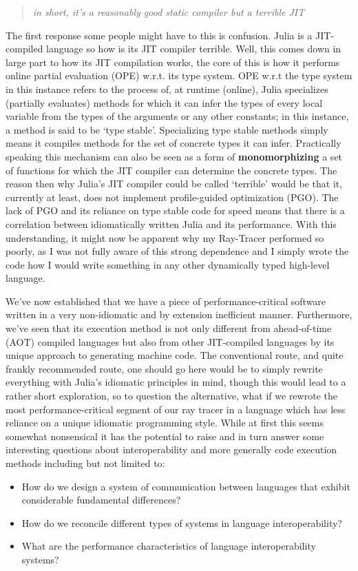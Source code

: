 \begin{quote}
    \textit{in short, it's a reasonably good static compiler but a terrible JIT}
\end{quote}

The first response some people might have to this is confusion. Julia is a JIT-compiled language so how is its JIT compiler terrible. Well, this comes down in large part to how its JIT compilation works, the core of this is how it performs online partial evaluation (OPE) w.r.t. its type system. OPE w.r.t the type system in this instance refers to the process of, at runtime (online), Julia specializes (partially evaluates) methods for which it can infer the types of every local variable from the types of the arguments or any other constants; in this instance, a method is said to be `type stable'. Specializing type stable methods simply means it compiles methods for the set of concrete types it can infer. Practically speaking this mechanism can also be seen as a form of \textbf{monomorphizing} a set of functions for which the JIT compiler can determine the concrete types. The reason then why Julia's JIT compiler could be called `terrible' would be that it, currently at least, does not implement profile-guided optimization (PGO). The lack of PGO and its reliance on type stable code for speed means that there is a correlation between idiomatically written Julia and its performance. With this understanding, it might now be apparent why my Ray-Tracer performed so poorly, as I was not fully aware of this strong dependence and I simply wrote the code how I would write something in any other dynamically typed high-level language.

We've now established that we have a piece of performance-critical software written in a very non-idiomatic and by extension inefficient manner. Furthermore, we've seen that its execution method is not only different from ahead-of-time (AOT) compiled languages but also from other JIT-compiled languages by its unique approach to generating machine code. The conventional route, and quite frankly recommended route, one should go here would be to simply rewrite everything with Julia's idiomatic principles in mind, though this would lead to a rather short exploration, so to question the alternative, what if we rewrote the most performance-critical segment of our ray tracer in a language which has less reliance on a unique idiomatic programming style. While at first this seems somewhat nonsensical it has the potential to raise and in turn answer some interesting questions about interoperability and more generally code execution methods including but not limited to:
\begin{itemize}
    \item How do we design a system of communication between languages that exhibit considerable fundamental differences?
    \item How do we reconcile different types of systems in language interoperability?
    \item What are the performance characteristics of language interoperability systems?
\end{itemize}


 